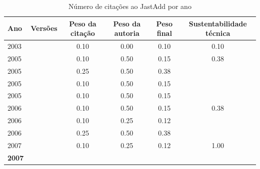 \begin{table}[H]
\caption{Número de citações ao JastAdd por ano}
\centering
\begin{tabular}{| l | c | c | c | c | c |}
  \hline
  Ano & Versões & Peso da citação & Peso da autoria & Peso final & Sustentabilidade técnica \\
  \hline
            2003
          &
          
          &
          0.10
          &
          0.00
          &
          0.10
          &
            {\color{red} 0.10}
          \\
\hline
            2005
          &
          
          &
          0.10
          &
          0.50
          &
          0.15
          &
            {\color{red} 0.38}
          \\
            2005
          &
          
          &
          0.25
          &
          0.50
          &
          0.38
          &
          \\
            2005
          &
          
          &
          0.10
          &
          0.50
          &
          0.15
          &
          \\
            2005
          &
          
          &
          0.10
          &
          0.50
          &
          0.15
          &
          \\
\hline
            2006
          &
          
          &
          0.10
          &
          0.50
          &
          0.15
          &
            {\color{red} 0.38}
          \\
            2006
          &
          
          &
          0.10
          &
          0.25
          &
          0.12
          &
          \\
            2006
          &
          
          &
          0.25
          &
          0.50
          &
          0.38
          &
          \\
\hline
            2007
          &
          
          &
          0.10
          &
          0.25
          &
          0.12
          &
            {\color{blue} 1.00}
          \\
            {\bf 2007}
          &
          

\end{tabular}
\end{table}
